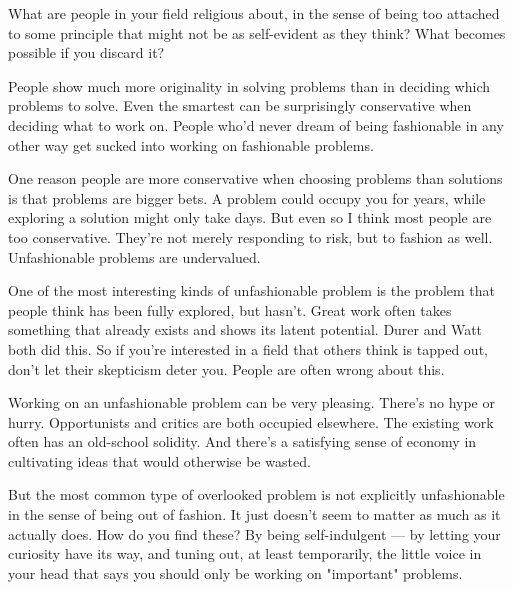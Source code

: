 What are people in your field religious about, in
                  the sense of being too attached to some principle that might
                  not be as self-evident as they think? What becomes possible if
                  you discard it?






                  People show much more originality in solving problems than in
                  deciding which problems to solve. Even the smartest can be
                  surprisingly conservative when deciding what to work on.
                  People who'd never dream of being fashionable in any other way
                  get sucked into working on fashionable problems.

One
                  reason people are more conservative when choosing problems
                  than solutions is that problems are bigger bets. A problem
                  could occupy you for years, while exploring a solution might
                  only take days. But even so I think most people are too
                  conservative. They're not merely responding to risk, but to
                  fashion as well. Unfashionable problems are undervalued.

One
                  of the most interesting kinds of unfashionable problem is the
                  problem that people think has been fully explored, but hasn't.
                  Great work often takes something that already exists and shows
                  its latent potential. Durer and Watt both did this. So if
                  you're interested in a field that others think is tapped out,
                  don't let their skepticism deter you. People are often wrong
                  about this.

Working on an unfashionable problem can
                  be very pleasing. There's no hype or hurry. Opportunists and
                  critics are both occupied elsewhere. The existing work often
                  has an old-school solidity. And there's a satisfying sense of
                  economy in cultivating ideas that would otherwise be
                  wasted.

But the most common type of overlooked
                  problem is not explicitly unfashionable in the sense of being
                  out of fashion. It just doesn't seem to matter as much as it
                  actually does. How do you find these? By being self-indulgent
                  --- by letting your curiosity have its way, and tuning
                  out, at least temporarily, the little voice in your head that
                  says you should only be working on "important" problems.

